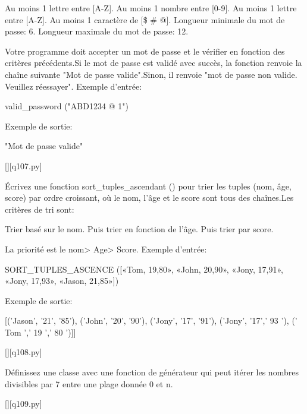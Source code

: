 Au moins 1 lettre entre [A-Z].
Au moins 1 nombre entre [0-9].
Au moins 1 lettre entre [A-Z].
Au moins 1 caractère de [\$ \# @].
Longueur minimale du mot de passe: 6.
Longueur maximale du mot de passe: 12.

Votre programme doit accepter un mot de passe et le vérifier en fonction des critères précédents.Si le mot de passe est validé avec succès, la fonction renvoie la chaîne suivante "Mot de passe valide".Sinon, il renvoie "mot de passe non valide. Veuillez réessayer".
Exemple d'entrée:

valid\_password ("ABD1234 @ 1")

Exemple de sortie:

"Mot de passe valide"
        \par
        \renewcommand{\nomfichier}{q107.py}
        \begin{solution}
            \pythonfile{\chemincode \nomfichier}[][\nomfichier]
        \end{solution}
        

        \question
        Écrivez une fonction sort\_tuples\_ascendant () pour trier les tuples (nom, âge, score) par ordre croissant, où le nom, l'âge et le score sont tous des chaînes.Les critères de tri sont:

Trier basé sur le nom.
Puis trier en fonction de l'âge.
Puis trier par score.

La priorité est le nom> Age> Score.
Exemple d'entrée:

SORT\_TUPLES\_ASCENCE ([«Tom, 19,80», «John, 20,90», «Jony, 17,91», «Jony, 17,93», «Jason, 21,85»])

Exemple de sortie:

[('Jason', '21', '85'), ('John', '20', '90'), ('Jony', '17', '91'), ('Jony', '17',' 93 '), (' Tom ',' 19 ',' 80 ')]]
        \par
        \renewcommand{\nomfichier}{q108.py}
        \begin{solution}
            \pythonfile{\chemincode \nomfichier}[][\nomfichier]
        \end{solution}
        

        \question
        Définissez une classe avec une fonction de générateur qui peut itérer les nombres divisibles par 7 entre une plage donnée 0 et n.
        \par
        \renewcommand{\nomfichier}{q109.py}
        \begin{solution}
            \pythonfile{\chemincode \nomfichier}[][\nomfichier]
        \end{solution}
        

